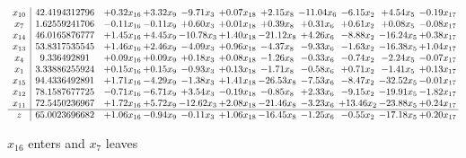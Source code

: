 \documentclass[9pt]{article}
\begin{document}
 \[\begin{array}{c| c c@{\hskip 2pt} c@{\hskip 2pt} c@{\hskip 2pt} c@{\hskip 2pt} c@{\hskip 2pt} c@{\hskip 2pt} c@{\hskip 2pt} c@{\hskip 2pt} c@{\hskip 2pt} }
 x_{10}   &  42.4194312796 & +  0.32 x_{16} & +  3.32 x_{9} & -9.71 x_{3} & +  0.07 x_{18} & +  2.15 x_{8} & -11.04 x_{6} & -6.15 x_{2} & +  4.54 x_{5} & -0.19 x_{17}\\
 x_{7}   &  1.62559241706 & -0.11 x_{16} & -0.11 x_{9} & +  0.60 x_{3} & +  0.01 x_{18} & +  0.39 x_{8} & +  0.31 x_{6} & +  0.61 x_{2} & +  0.08 x_{5} & -0.08 x_{17}\\
 x_{14}   &  46.0165876777 & +  1.45 x_{16} & +  4.45 x_{9} & -10.78 x_{3} & +  1.40 x_{18} & -21.12 x_{8} & +  4.26 x_{6} & -8.88 x_{2} & -16.24 x_{5} & +  0.38 x_{17}\\
 x_{13}   &  53.8317535545 & +  1.46 x_{16} & +  2.46 x_{9} & -4.09 x_{3} & +  0.96 x_{18} & -4.37 x_{8} & -9.33 x_{6} & -1.63 x_{2} & -16.38 x_{5} & +  1.04 x_{17}\\
 x_{4}   &  9.336492891 & +  0.09 x_{16} & +  0.09 x_{9} & +  0.18 x_{3} & +  0.08 x_{18} & -1.26 x_{8} & -0.33 x_{6} & -0.74 x_{2} & -2.24 x_{5} & -0.07 x_{17}\\
 x_{1}   &  3.33886255924 & +  0.15 x_{16} & +  0.15 x_{9} & -0.93 x_{3} & +  0.13 x_{18} & -1.71 x_{8} & -0.58 x_{6} & +  0.71 x_{2} & -1.41 x_{5} & +  0.13 x_{17}\\
 x_{15}   &  94.4336492891 & +  1.71 x_{16} & -4.29 x_{9} & -1.38 x_{3} & +  1.41 x_{18} & -26.53 x_{8} & -7.53 x_{6} & -8.47 x_{2} & -32.52 x_{5} & -0.01 x_{17}\\
 x_{12}   &  78.1587677725 & -0.71 x_{16} & -6.71 x_{9} & +  3.54 x_{3} & -0.19 x_{18} & -0.85 x_{8} & +  2.33 x_{6} & -9.15 x_{2} & -19.91 x_{5} & -1.82 x_{17}\\
 x_{11}   &  72.5450236967 & +  1.72 x_{16} & +  5.72 x_{9} & -12.62 x_{3} & +  2.08 x_{18} & -21.46 x_{8} & -3.23 x_{6} & + 13.46 x_{2} & -23.88 x_{5} & +  0.24 x_{17}\\
\hline
z    &  65.0023696682 & +  1.06 x_{16} & -0.94 x_{9} & -0.11 x_{3} & +  1.06 x_{18} & -16.45 x_{8} & -1.25 x_{6} & -0.55 x_{2} & -17.18 x_{5} & +  0.20 x_{17}\\
\end{array}\]


 $ x_{16} $ enters and $ x_{7} $ leaves 
\end{document}
